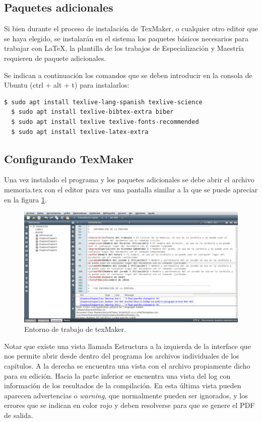 \subsection{Paquetes adicionales}

Si bien durante el proceso de instalación de TexMaker, o cualquier otro editor que se haya elegido, se instalarán en el sistema los paquetes básicos necesarios para trabajar con \LaTeX{}, la plantilla de los trabajos de Especialización y Maestría requieren de paquete adicionales.

Se indican a continuación los comandos que se deben introducir en la consola de Ubuntu (ctrl + alt + t) para instalarlos:

\begin{lstlisting}[language=bash]
  $ sudo apt install texlive-lang-spanish texlive-science 
  $ sudo apt install texlive-bibtex-extra biber
  $ sudo apt install texlive texlive-fonts-recommended
  $ sudo apt install texlive-latex-extra
\end{lstlisting}


\subsection{Configurando TexMaker}


Una vez instalado el programa y los paquetes adicionales se debe abrir el archivo memoria.tex con el editor para ver una pantalla similar a la que se puede apreciar en la figura \ref{fig:texmaker}. 

\begin{figure}[h]
	\centering
	\includegraphics[width=\textwidth]{./Figures/texmaker.png}
	\caption{Entorno de trabajo de texMaker.}
	\label{fig:texmaker}
\end{figure}

Notar que existe una vista llamada Estructura a la izquierda de la interface que nos permite abrir desde dentro del programa los archivos individuales de los capítulos.  A la derecha se encuentra una vista con el archivo propiamente dicho para su edición. Hacia la parte inferior se encuentra una vista del log con información de los resultados de la compilación.  En esta última vista pueden aparecen advertencias o \textit{warning}, que normalmente pueden ser ignorados, y los errores que se indican en color rojo y deben resolverse para que se genere el PDF de salida.

